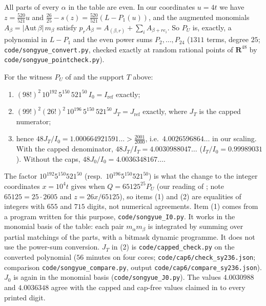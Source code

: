 All parts of every $\alpha$ in the table are even. In our coordinates $u=4t$
we have $z=\frac{520}{521}u$ and
$\frac{26}{25}-s(z)=\frac{520}{521}(L-P_1(u))$, and the augmented monomials
$A_\beta=|\mathrm{Aut}\,\beta|\,m_\beta$ satisfy
$p_rA_\beta=A_{(\beta,r)}+\sum_iA_{\beta+r e_i}$. So $P_U$ is, exactly, a
polynomial in $L-P_1$ and the even power sums $P_2,\dots,P_{24}$ ($1311$
terms, degree $25$; \texttt{code/songyue\_convert.py}, checked exactly at
random rational points of $\mathbf{R}^{48}$ by \texttt{code/songyue\_pointcheck.py}).

\begin{proposition}\label{prop:sy-exact}
For the witness $P_U$ of \cite{SY26} and the support $T$ above:
\begin{enumerate}
\item $(98!)^2\,10^{192}\,5^{150}\,521^{50}\,I_0=I_{\mathrm{ref}}$ exactly;
\item $(99!)^2(26!)^2\,10^{196}\,5^{150}\,521^{50}\,J_T=J_{\mathrm{ref}}$ exactly,
where $J_T$ is the capped numerator;
\item hence $48J_T/I_0=1.000664921591\ldots>\frac{2001}{2000}$, i.e.\
$4.0026596864\ldots$ in our scaling. With the capped denominator,
$48J_T/I_T=4.0030988047\ldots$ ($I_T/I_0=0.99989031$). Without the caps,
$48J_0/I_0=4.0036348167\ldots$.
\end{enumerate}
\end{proposition}
\begin{sloppypar}
The factor $10^{192}5^{150}521^{50}$ (resp.\ $10^{196}5^{150}521^{50}$) is
what the change to the integer coordinates $x=10^4t$ gives when
$Q=65125^{25}P_U$ (our reading of \cite[Eq.~(71)]{SY26}; note
$65125=25\cdot2605$ and $z=26x/65125$), so items (1) and (2) are
equalities of integers with $655$ and $715$ digits, not numerical agreements.
Item (1) comes from a program written for this purpose,
\texttt{code/songyue\_I0.py}. It works in the monomial basis of the table:
each pair $m_\alpha m_\beta$ is integrated by summing over partial matchings of
the parts, with a bitmask dynamic programme. It does not use the power-sum
conversion. $J_T$ in (2) is \texttt{code/capped\_check.py} on the converted
polynomial ($56$ minutes on four cores; \texttt{code/cap6/check\_sy236.json};
comparison \texttt{code/songyue\_compare.py}, output
\texttt{code/cap6/compare\_sy236.json}). $J_0$ is again in the monomial basis
(\texttt{code/songyue\_J0.py}). The values $4.0030988$ and $4.0036348$ agree
with the capped and cap-free values claimed in \cite{Kin26} to every printed
digit.
\end{sloppypar}
